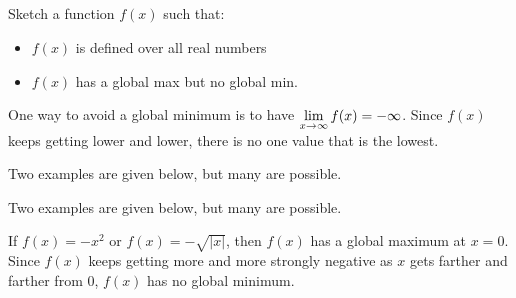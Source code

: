 %
%
\subsection*{\Conceptual}



\begin{question}
Sketch a function $f(x)$ such that:
\begin{itemize}
\item $f(x)$ is defined over all real numbers
\item $f(x)$ has a global max but no global min.
\end{itemize}
\end{question}
\begin{hint}
One way to avoid a global minimum is to have $\displaystyle\lim_{x \to \infty}f(x)=-\infty$. Since $f(x)$ keeps getting lower and lower, there is no one value that is the lowest.
\end{hint}
\begin{answer}
Two examples are given below, but many are possible.
\begin{center}
\hspace{2cm}
\end{center}
\end{answer}
\begin{solution}
Two examples are given below, but many are possible.
\begin{center}
\hspace{2cm}
\end{center}
If $f(x)=-x^2$ or $f(x)=-\sqrt{|x|}$, then $f(x)$ has a global maximum at $x=0$. Since $f(x)$ keeps getting more and more strongly negative as $x$ gets farther and farther from 0, $f(x)$ has no global minimum.
\end{solution}


